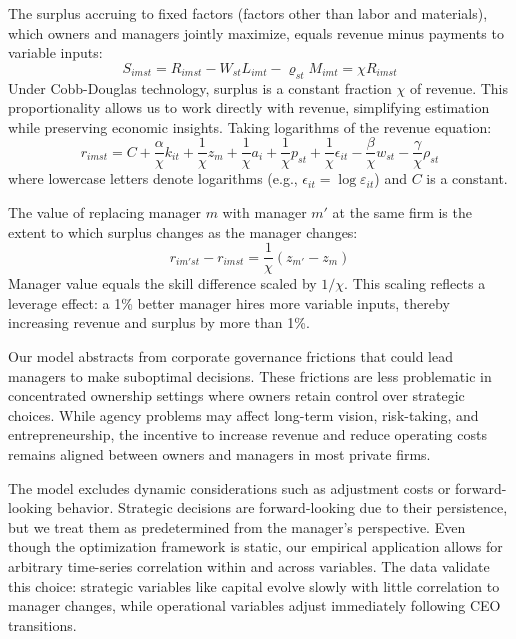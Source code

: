 \documentclass[11pt,a4paper]{article}
\begin{document}
The surplus accruing to fixed factors (factors other than labor and materials), which owners and managers jointly maximize, equals revenue minus payments to variable inputs:
\begin{equation}\label{eq:surplus}
S_{imst} = R_{imst} - W_{st}L_{imt} - \varrho_{st}M_{imt} = \chi R_{imst}
\end{equation}
Under Cobb-Douglas technology, surplus is a constant fraction $\chi$ of revenue. This proportionality allows us to work directly with revenue, simplifying estimation while preserving economic insights. Taking logarithms of the revenue equation:
\begin{equation}\label{eq:log_revenue}
r_{imst} = C+\frac{\alpha}{\chi} k_{it} + \frac{1}{\chi} z_{m} + \frac{1}{\chi} a_i + \frac{1}{\chi} p_{st} + \frac{1}{\chi}\epsilon_{it} 
- \frac{\beta}{\chi} w_{st} - \frac{\gamma}{\chi} \rho_{st}
\end{equation}
where lowercase letters denote logarithms (e.g., $\epsilon_{it} = \log \varepsilon_{it}$) and $C$ is a constant.

The value of replacing manager $m$ with manager $m'$ at the same firm is the extent to which surplus changes as the manager changes:
\begin{equation}\label{eq:manager_value}
r_{im'st} - r_{imst} = \frac{1}{\chi}(z_{m'} - z_{m})
\end{equation}
Manager value equals the skill difference scaled by $1/\chi$. This scaling reflects a leverage effect: a 1\% better manager hires more variable inputs, thereby increasing revenue and surplus by more than 1\%.

Our model abstracts from corporate governance frictions that could lead managers to make suboptimal decisions. These frictions are less problematic in concentrated ownership settings where owners retain control over strategic choices. While agency problems may affect long-term vision, risk-taking, and entrepreneurship, the incentive to increase revenue and reduce operating costs remains aligned between owners and managers in most private firms.

The model excludes dynamic considerations such as adjustment costs or forward-looking behavior. Strategic decisions are forward-looking due to their persistence, but we treat them as predetermined from the manager's perspective. Even though the optimization framework is static, our empirical application allows for arbitrary time-series correlation within and across variables. The data validate this choice: strategic variables like capital evolve slowly with little correlation to manager changes, while operational variables adjust immediately following CEO transitions.
\end{document}
